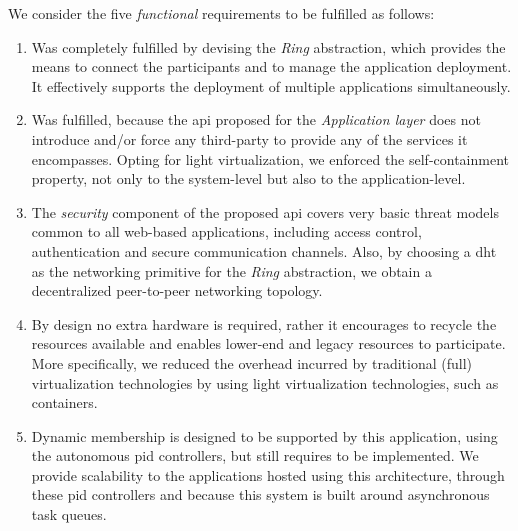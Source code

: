 \documentclass[12pt, titlepage]{uo_temp}
\begin{document}
     We consider the five \emph{functional} requirements to be fulfilled as follows:
     \begin{enumerate}[label={\bf Requirement \arabic*},
                       wide=\parindent,
                       leftmargin=\parindent,
                       rightmargin=\parindent]
                     \item Was completely fulfilled by devising the \emph{Ring}
                       abstraction, which provides the means to connect the participants
                       and to manage the application deployment. It effectively supports
                       the deployment of multiple applications simultaneously.
     \item Was fulfilled, because the \gls{api} proposed for the \emph{Application layer}
       does not introduce and/or force any third-party to provide any of the services it
       encompasses. Opting for light virtualization, we enforced the self-containment
       property, not only to the system-level but also to the application-level.
     \item The \emph{security} component of the proposed \gls{api} covers very basic threat
       models common to all web-based applications, including access control,
       authentication and secure communication channels. Also, by choosing a \gls{dht} as
       the networking primitive for the \emph{Ring} abstraction, we obtain a
       decentralized peer-to-peer networking topology.
     \item By design no extra hardware is required, rather it encourages to recycle
       the resources available and enables lower-end and legacy resources to participate. More
       specifically, we reduced the overhead incurred by traditional (full) virtualization
       technologies by using light virtualization technologies, such as containers.
     \item Dynamic membership is designed to be supported by this application, using the
       autonomous \gls{pid} controllers, but still requires to be implemented. We provide
       scalability to the applications hosted using this architecture, through these \gls{pid}
       controllers and because this system is built around asynchronous task queues.
     \end{enumerate}
\end{document}
